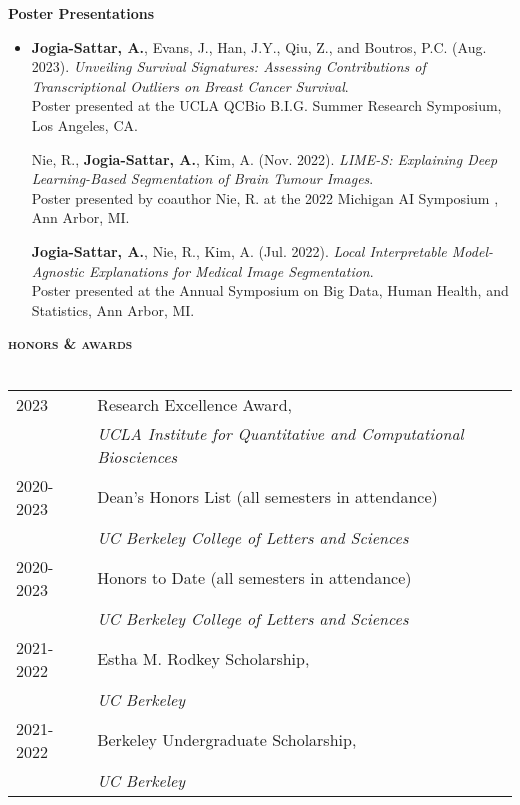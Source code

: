 \documentclass[a4paper]{article}
\newcommand{\lineunder} {
    \vspace*{-8pt} \\
    \hspace*{-18pt} \hrulefill \\
}
\newcommand{\header} [1] {
    {\hspace*{-18pt}\vspace*{6pt} \large{\textbf{\textsc{\MakeLowercase{#1}}}}}
    \vspace*{-6pt}\lineunder
}
\begin{document}
\textbf{Poster Presentations}
\begin{itemize}
\item[] 
    \textbf{Jogia-Sattar, A.}, Evans, J., Han, J.Y., Qiu, Z., and Boutros, P.C. (Aug. 2023). \textit{Unveiling Survival Signatures: Assessing Contributions of Transcriptional Outliers on Breast Cancer Survival}. \\
    Poster presented at the UCLA QCBio B.I.G. Summer Research Symposium, Los Angeles, CA.
    
    \vspace{2mm}
    
    Nie, R., \textbf{Jogia-Sattar, A.}, Kim, A. (Nov. 2022). \textit{LIME-S: Explaining Deep Learning-Based Segmentation of Brain Tumour Images}. \\
    Poster presented by coauthor Nie, R. at the 2022 Michigan AI Symposium , Ann Arbor, MI.

     \vspace{2mm}
    
    \textbf{Jogia-Sattar, A.}, Nie, R., Kim, A. (Jul. 2022). \textit{Local Interpretable Model-Agnostic Explanations for Medical Image Segmentation}. \\
    Poster presented at the Annual Symposium on Big Data, Human Health, and Statistics, Ann Arbor, MI.
\end{itemize}
\vspace{2mm}
\header{Honors \& Awards}
\vspace{2mm}

\begin{tabular}{@{}l l}
    2023 & Research Excellence Award, \\
         & \textit{UCLA Institute for Quantitative and Computational Biosciences} \\ [4pt]
    2020-2023 & Dean's Honors List (all semesters in attendance) \\
        & \textit{UC Berkeley College of Letters and Sciences} \\ [4pt]
    2020-2023 & Honors to Date (all semesters in attendance) \\
        & \textit{UC Berkeley College of Letters and Sciences} \\ [4pt]
    2021-2022 & Estha M. Rodkey Scholarship, \\
         & \textit{UC Berkeley} \\ [4pt]
    2021-2022 & Berkeley Undergraduate Scholarship, \\
         & \textit{UC Berkeley} \\

\end{tabular}
\end{document}
